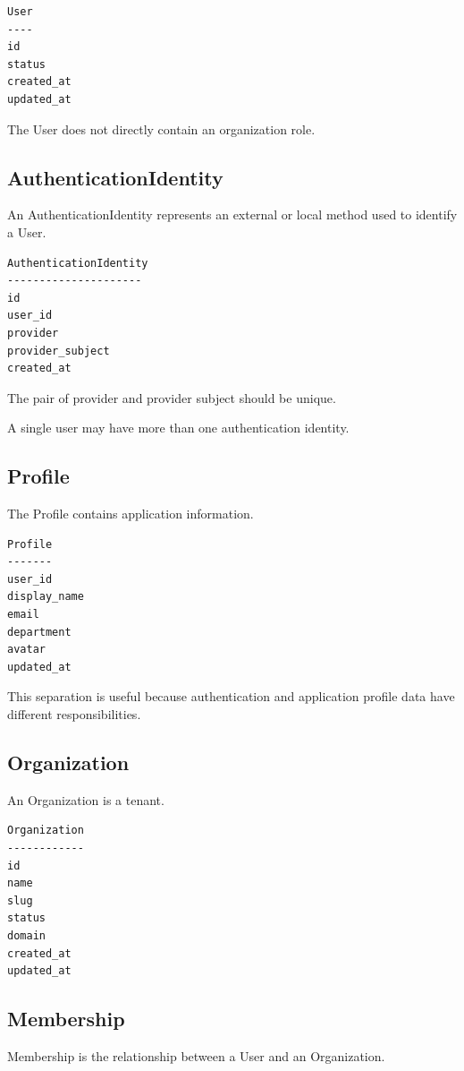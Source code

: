 \documentclass[11pt,a4paper]{article}
\begin{document}
\begin{verbatim}
User
----
id
status
created_at
updated_at
\end{verbatim}

The User does not directly contain an organization role.

\subsection{AuthenticationIdentity}

An AuthenticationIdentity represents an external or local method used to identify a User.

\begin{verbatim}
AuthenticationIdentity
---------------------
id
user_id
provider
provider_subject
created_at
\end{verbatim}

The pair of provider and provider subject should be unique.

A single user may have more than one authentication identity.

\subsection{Profile}

The Profile contains application information.

\begin{verbatim}
Profile
-------
user_id
display_name
email
department
avatar
updated_at
\end{verbatim}

This separation is useful because authentication and application profile data have different responsibilities.

\subsection{Organization}

An Organization is a tenant.

\begin{verbatim}
Organization
------------
id
name
slug
status
domain
created_at
updated_at
\end{verbatim}

\subsection{Membership}

Membership is the relationship between a User and an Organization.
\end{document}
